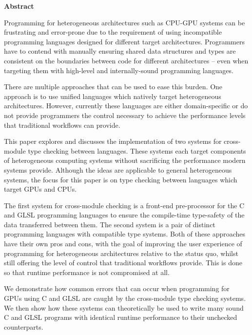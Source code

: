 \newpage
{\Huge \bf Abstract}
\vspace{24pt}






Programming for heterogeneous architectures such as CPU-GPU systems can be
frustrating and error-prone due to the requirement of using incompatible
programming languages designed for different target architectures. Programmers
have to contend with manually ensuring shared data structures and types are
consistent on the boundaries between code for different architectures -- even
when targeting them with high-level and internally-sound programming languages.

There are multiple approaches that can be used to ease this burden. One
approach is to use unified languages which natively target heterogeneous
architectures. However, currently these languages are either domain-specific or
do not provide programmers the control necessary to achieve the performance
levels that traditional workflows can provide.

This paper explores and discusses the implementation of two systems for
cross-module type checking between languages. These systems each target
components of heterogeneous computing systems without sacrificing the
performance modern systems provide. Although the ideas are applicable to
general heterogeneous systems, the focus for this paper is on type checking
between languages which target GPUs and CPUs.

The first system for cross-module checking is a front-end pre-processor for the
C and GLSL programming languages to ensure the compile-time type-safety of the
data transferred between them. The second system is a pair of distinct
programming languages with compatible type systems. Both of these approaches
have their own pros and cons, with the goal of improving the user experience of
programming for heterogeneous architectures relative to the status quo, whilst
still offering the level of control that traditional workflows provide. This is
done so that runtime performance is not compromised at all.

We demonstrate how common errors that can occur when programming for GPUs using
C and GLSL are caught by the cross-module type checking systems. We then show
how these systems can theoretically be used to write many sound C and GLSL
programs with identical runtime performance to their unchecked counterparts.

\newpage
\vspace*{\fill}
